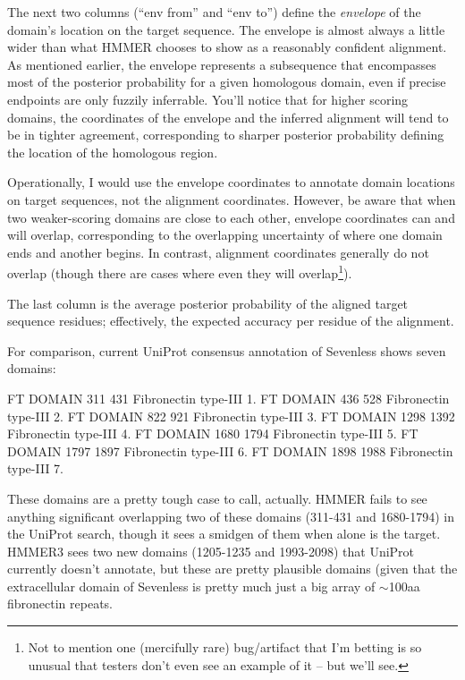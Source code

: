 The next two columns (``env from'' and ``env to'') define the
\emph{envelope} of the domain's location on the target sequence.  The
envelope is almost always a little wider than what HMMER chooses to
show as a reasonably confident alignment. As mentioned earlier, the
envelope represents a subsequence that encompasses most of the
posterior probability for a given homologous domain, even if precise
endpoints are only fuzzily inferrable. You'll notice that for higher
scoring domains, the coordinates of the envelope and the inferred
alignment will tend to be in tighter agreement, corresponding to
sharper posterior probability defining the location of the homologous
region. 

Operationally, I would use the envelope coordinates to annotate domain
locations on target sequences, not the alignment coordinates. However,
be aware that when two weaker-scoring domains are close to each other,
envelope coordinates can and will overlap, corresponding to the
overlapping uncertainty of where one domain ends and another begins.
In contrast, alignment coordinates generally do not overlap (though
there are cases where even they will overlap\footnote{Not to mention
  one (mercifully rare) bug/artifact that I'm betting is so unusual
  that testers don't even see an example of it -- but we'll
  see.}).

The last column is the average posterior probability of the aligned
target sequence residues; effectively, the expected accuracy per
residue of the alignment.

For comparison, current UniProt consensus annotation of Sevenless
shows seven domains:

\begin{sreoutput}
FT   DOMAIN      311    431       Fibronectin type-III 1.
FT   DOMAIN      436    528       Fibronectin type-III 2.
FT   DOMAIN      822    921       Fibronectin type-III 3.
FT   DOMAIN     1298   1392       Fibronectin type-III 4.
FT   DOMAIN     1680   1794       Fibronectin type-III 5.
FT   DOMAIN     1797   1897       Fibronectin type-III 6.
FT   DOMAIN     1898   1988       Fibronectin type-III 7.
\end{sreoutput}

These domains are a pretty tough case to call, actually. HMMER fails
to see anything significant overlapping two of these domains (311-431
and 1680-1794) in the UniProt search, though it sees a smidgen of them
when  alone is the target. HMMER3 sees two new
domains (1205-1235 and 1993-2098) that UniProt currently doesn't
annotate, but these are pretty plausible domains (given that the
extracellular domain of Sevenless is pretty much just a big array of
$\sim$100aa fibronectin repeats.


